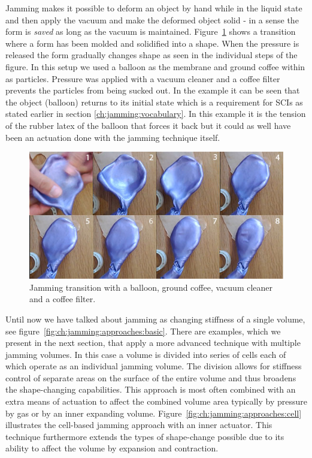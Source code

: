 Jamming makes it possible to deform an object by hand while in the liquid state and then apply the vacuum and make the deformed object solid - in a sense the form is \emph{saved} as long as the vacuum is maintained.
Figure~\ref{fig:ch:jamming:jamming-transition} shows a transition where a form has been molded and solidified into a shape.
When the pressure is released the form gradually changes shape as seen in the individual steps of the figure.
In this setup we used a balloon as the membrane and ground coffee within as particles.
Pressure was applied with a vacuum cleaner and a coffee filter prevents the particles from being sucked out.
In the example it can be seen that the object (balloon) returns to its initial state which is a requirement for SCIs as stated earlier in section \ref{ch:jamming:vocabulary}.
In this example it is the tension of the rubber latex of the balloon that forces it back but it could as well have been an actuation done with the jamming technique itself. 

\begin{figure}[h]
  \centering
  \includegraphics[width=.9\textwidth]{figures/jamming/jamming-transition}
  \caption[A jamming transition setup.]
  {Jamming transition with a balloon, ground coffee, vacuum cleaner and a coffee filter.}
  \label{fig:ch:jamming:jamming-transition}
\end{figure}

Until now we have talked about jamming as changing stiffness of a single volume, see figure~\ref{fig:ch:jamming:approaches:basic}.
There are examples, which we present in the next section, that apply a more advanced technique with multiple jamming volumes.
In this case a volume is divided into series of cells each of which operate as an individual jamming volume.
The division allows for stiffness control of separate areas on the surface of the entire volume and thus broadens the shape-changing capabilities.
This approach is most often combined with an extra means of actuation to affect the combined volume area typically by pressure by gas or by an inner expanding volume. 
Figure~\ref{fig:ch:jamming:approaches:cell} illustrates the cell-based jamming approach with an inner actuator.
This technique furthermore extends the types of shape-change possible due to its ability to affect the volume by expansion and contraction. 

